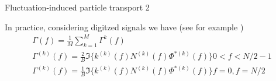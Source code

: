 \documentclass[t,10pt]{beamer}
\begin{document}
\begin{frame}{Fluctuation-induced particle transport 2}
\begin{itemize}
{\footnotesize
\item In practice, considering digitzed signals we have
  \footnotesize{(see for example \parencite{Antoni:2000bn})}
\begin{gather*}
\Gamma(f)=\frac{1}{M}\sum_{k=1}^{M}\Gamma^{k}(f) \\
\Gamma^{(k)}(f)=\frac{2}{B}\Im\{k^{(k)}(f)N^{(k)}(f)\Phi^{*(k)}(f)\}
 0<f<N/2-1 \\
\Gamma^{(k)}(f)=\frac{1}{B}\Im\{k^{(k)}(f)N^{(k)}(f)\Phi^{*(k)}(f)\}
 f=0,f=N/2
\end{gather*}
}


\end{itemize}
\end{frame}
\end{document}
